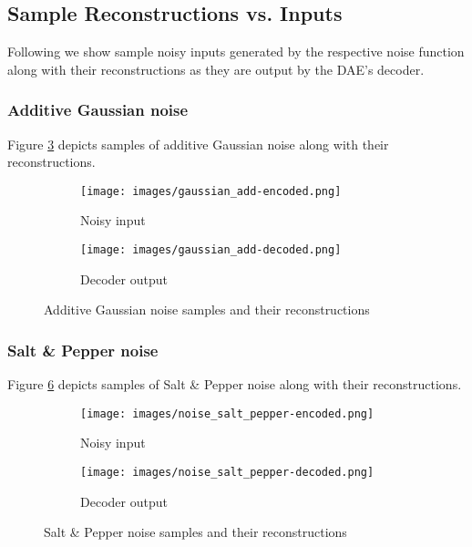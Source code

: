 \documentclass[10pt, a4paper]{article}
\begin{document}
    \subsection{Sample Reconstructions vs. Inputs}
    Following we show sample noisy inputs generated by the respective noise function along with their reconstructions as they are output by the DAE's decoder.
    
    \subsubsection{Additive Gaussian noise}
    Figure \ref{fig:figag} depicts samples of additive Gaussian noise along with their reconstructions.
    
    \begin{figure}[h]
    \begin{subfigure}{0.2\textwidth}
    \texttt{[image: images/gaussian\_add-encoded.png]} 
    \caption{Noisy input}
    \label{fig:subim1}
    \end{subfigure}
    \begin{subfigure}{0.2\textwidth}
    \texttt{[image: images/gaussian\_add-decoded.png]}
    \caption{Decoder output}
    \label{fig:subim2}
    \end{subfigure}
    \caption{Additive Gaussian noise samples and their reconstructions}
    \label{fig:figag}
    \end{figure}
    
    \subsubsection{Salt \& Pepper noise}
    Figure \ref{fig:figsp} depicts samples of Salt \& Pepper noise along with their reconstructions.
    
    \begin{figure}[h]
    \begin{subfigure}{0.2\textwidth}
    \texttt{[image: images/noise\_salt\_pepper-encoded.png]} 
    \caption{Noisy input}
    \label{fig:subim1}
    \end{subfigure}
    \begin{subfigure}{0.2\textwidth}
    \texttt{[image: images/noise\_salt\_pepper-decoded.png]}
    \caption{Decoder output}
    \label{fig:subim2}
    \end{subfigure}
    \caption{Salt \& Pepper noise samples and their reconstructions}
    \label{fig:figsp}
    \end{figure}
    
\end{document}
